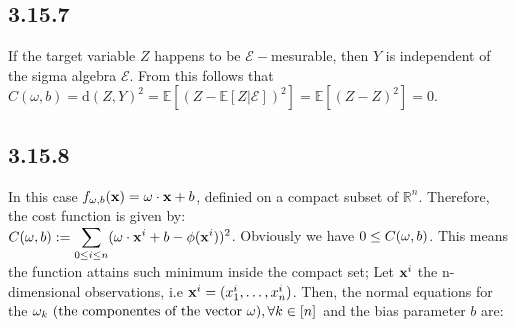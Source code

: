 \documentclass{exam}
\begin{document}
\subsection*{3.15.7}
If the target variable $Z$ happens to be $\mathcal{E}-$mesurable, then $Y$ is independent of the sigma algebra $\mathcal{E}$. From this follows that $C(\omega, b) = \text{d}(Z,Y)^2 = \mathbb{E} \left[ (Z - \mathbb{E}\left[ Z |\mathcal{E} \right] )^2\right]  = \mathbb{E} \left[ (Z - Z)^2\right] = 0$.

\subsection*{3.15.8}
In this case $ \displaystyle f_{\tiny \bold{\omega}, b}(\bold{x}) = \bold{\omega} \cdot \bold{x} + b$, definied on a compact subset of $\mathbb{R}^n$. Therefore, the cost function is given by: \\[0.25 em]
$C(\bold{\omega}, b) := \displaystyle \sum_{\tiny 0 \leq i\leq n } ( \bold{\omega} \cdot \bold{x}^{i} + b - \phi(\bold{x}^{i}))^{2}$. Obviously we have $0 \leq C(\bold{\omega}, b)$. This means the function attains such minimum inside the compact set; Let $\bold{x}^{i}$ the n-dimensional observations, i.e $\bold{x}^{i}= (x_{1}^{i}, \ldots, x_{n}^{i})$. Then, the normal equations for the $\omega_k \text{ (the componentes of the vector $\bold{\omega}$)}, \forall k \in \left[n\right]$ and 
the bias parameter $b$ are:\\
\end{document}
